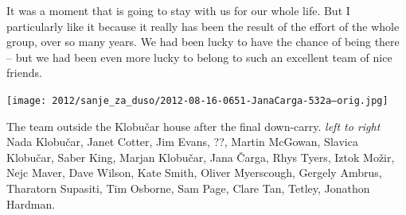 It was a moment that is going to stay with us for our whole life. But I
particularly like it because it really has been the result of the effort
of the whole group, over so many years. We had been lucky to have the
chance of being there -- but we had been even more lucky to belong to
such an excellent team of nice friends.


\begin{pagefigure}
\checkoddpage \ifoddpage \forcerectofloat \else \forceversofloat \fi
   \centering
\texttt{[image: 2012/sanje\_za\_duso/2012-08-16-0651-JanaCarga-532a--orig.jpg]}
\caption{The team outside the Klobučar house after the final down-carry. \textit{left to right} Nada Klobučar, Janet Cotter, Jim Evans, ??, Martin McGowan, Slavica Klobučar, Saber King, Marjan Klobučar, Jana Čarga, Rhys Tyers, Iztok Možir, Nejc Maver, Dave Wilson, Kate Smith, Oliver Myerscough, Gergely Ambrus, Tharatorn Supasiti, Tim Osborne, Sam Page, Clare Tan, Tetley, Jonathon Hardman. } \label{2012 expo photo}
\end{pagefigure}